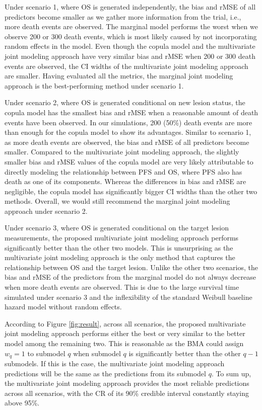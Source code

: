 Under scenario 1, where \ac{OS} is generated independently, the bias and \ac{rMSE} of all predictors become smaller as we gather more information from the trial, i.e., more death events are observed. The marginal model performs the worst when we observe 200 or 300 death events, which is most likely caused by not incorporating random effects in the model. Even though the copula model and the multivariate joint modeling approach have very similar bias and \ac{rMSE} when 200 or 300 death events are observed, the \ac{CI} widths of the multivariate joint modeling approach are smaller. Having evaluated all the metrics, the marginal joint modeling approach is the best-performing method under scenario 1.

Under scenario 2, where \ac{OS} is generated conditional on new lesion status, the copula model has the smallest bias and \ac{rMSE} when a reasonable amount of death events have been observed. In our simulations, 200 (50\%) death events are more than enough for the copula model to show its advantages. Similar to scenario 1, as more death events are observed, the bias and \ac{rMSE} of all predictors become smaller. Compared to the multivariate joint modeling approach, the slightly smaller bias and \ac{rMSE} values of the copula model are very likely attributable to directly modeling the relationship between \ac{PFS} and \ac{OS}, where \ac{PFS} also has death as one of its components. Whereas the differences in bias and \ac{rMSE} are negligible, the copula model has significantly bigger \ac{CI} widths than the other two methods. Overall, we would still recommend the marginal joint modeling approach under scenario 2.

Under scenario 3, where \ac{OS} is generated conditional on the target lesion measurements, the proposed multivariate joint modeling approach performs significantly better than the other two models. This is unsurprising as the multivariate joint modeling approach is the only method that captures the relationship between \ac{OS} and the target lesion. Unlike the other two scenarios, the bias and \ac{rMSE} of the predictors from the marginal model do not always decrease when more death events are observed. This is due to the large survival time simulated under scenario 3 and the inflexibility of the standard Weibull baseline hazard model without random effects. 

According to Figure \ref{fig:result}, across all scenarios, the proposed multivariate joint modeling approach performs either the best or very similar to the better model among the remaining two. This is reasonable as the \ac{BMA} could assign $w_q = 1$ to submodel $q$ when submodel $q$ is significantly better than the other $q-1$ submodels. If this is the case, the multivariate joint modeling approach predictions will be the same as the predictions from its submodel $q$. To sum up, the multivariate joint modeling approach provides the most reliable predictions across all scenarios, with the \ac{CR} of its 90\% credible interval constantly staying above 95\%. 

